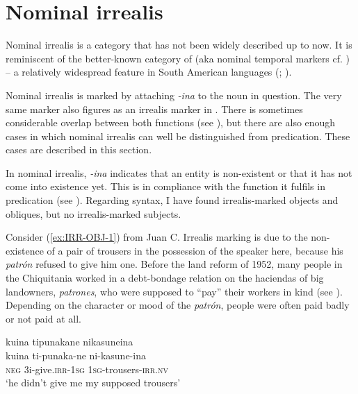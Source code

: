 
\section{Nominal irrealis}\label{NominalRS}

Nominal irrealis is a category that has not been widely described up to now. It is reminiscent of the better-known category of  \citep[]{NordlingerSadler2004} (aka nominal temporal markers cf. \citealt[]{Tonhauser2008}) – a relatively widespread feature in South American languages (\citealt[158--163]{Aikhenvald2012}; \citealt[258]{Campbell2012}).

Nominal irrealis is marked by attaching \textit{-ina} to the noun in question. The very same marker also figures as an irrealis marker in . There is sometimes considerable overlap between both functions (see ), but there are also enough cases in which nominal irrealis can well be distinguished from predication. These cases are described in this section.

In nominal irrealis, \textit{-ina} indicates that an entity is non-existent or that it has not come into existence yet. This is in compliance with the function it fulfils in predication (see ). Regarding syntax, I have found irrealis-marked objects and obliques, but no irrealis-marked subjects.

Consider (\ref{ex:IRR-OBJ-1}) from Juan C. Irrealis marking is due to the non-existence of a pair of trousers in the possession of the speaker here, because his \textit{patrón} refused to give him one. Before the land reform of 1952, many people in the Chiquitania worked in a debt-bondage relation on the haciendas of big landowners, \textit{patrones}, who were supposed to “pay” their workers in kind (see ). Depending on the character or mood of the \textit{patrón}, people were often paid badly or not paid at all.

\ea\label{ex:IRR-OBJ-1}
\begingl 
\glpreamble kuina tipunakane nikasuneina\\
\gla kuina ti-punaka-ne ni-kasune-ina\\ 
\glb \textsc{neg} 3i-give.\textsc{irr}-1\textsc{sg} 1\textsc{sg}-trousers-\textsc{irr.nv}\\ 
\glft ‘he didn’t give me my supposed trousers’
\trailingcitation{[mqx-p110826l.458]}
\xe

